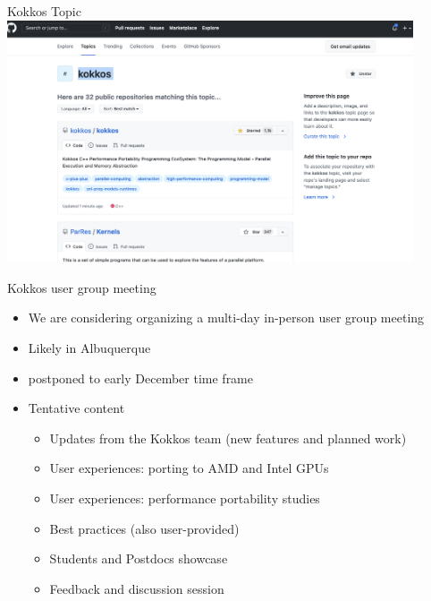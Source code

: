\begin{frame}[fragile]{Kokkos Topic}
  \includegraphics[width=0.9\textwidth]{3_7/kokkos-topic.png}
\end{frame}

\begin{frame}[fragile]{Kokkos user group meeting}
\begin{itemize}
\item We are considering organizing a multi-day in-person user group meeting
\item Likely in Albuquerque
\item postponed to early December time frame
\item Tentative content
   \begin{itemize}
   \item Updates from the Kokkos team (new features and planned work)
   \item User experiences: porting to AMD and Intel GPUs
   \item User experiences: performance portability studies
   \item Best practices (also user-provided)
   \item Students and Postdocs showcase
   \item Feedback and discussion session
   \end{itemize}
\end{itemize}
\end{frame}










